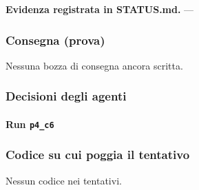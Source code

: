 \documentclass[11pt,a4paper]{article}
\begin{document}
\textbf{Evidenza registrata in STATUS.md.} —

\subsubsection{Consegna (prova)}
Nessuna bozza di consegna ancora scritta.

\subsubsection{Decisioni degli agenti}
\paragraph{Run \texttt{p4\_c6}}

\subsubsection{Codice su cui poggia il tentativo}
Nessun codice nei tentativi.
\end{document}
